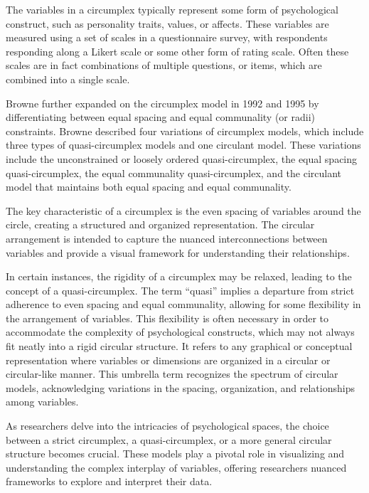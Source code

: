 \documentclass[
  authoryear,
  preprint,
  3p]{elsarticle}
\begin{document}
The variables in a circumplex typically represent some form of
psychological construct, such as personality traits, values, or affects.
These variables are measured using a set of scales in a questionnaire
survey, with respondents responding along a Likert scale or some other
form of rating scale. Often these scales are in fact combinations of
multiple questions, or items, which are combined into a single scale.

Browne further expanded on the circumplex model in 1992 and 1995 by
differentiating between equal spacing and equal communality (or radii)
constraints. Browne described four variations of circumplex models,
which include three types of quasi-circumplex models and one circulant
model. These variations include the unconstrained or loosely ordered
quasi-circumplex, the equal spacing quasi-circumplex, the equal
communality quasi-circumplex, and the circulant model that maintains
both equal spacing and equal communality.

The key characteristic of a circumplex is the even spacing of variables
around the circle, creating a structured and organized representation.
The circular arrangement is intended to capture the nuanced
interconnections between variables and provide a visual framework for
understanding their relationships.

In certain instances, the rigidity of a circumplex may be relaxed,
leading to the concept of a quasi-circumplex. The term ``quasi'' implies
a departure from strict adherence to even spacing and equal communality,
allowing for some flexibility in the arrangement of variables. This
flexibility is often necessary in order to accommodate the complexity of
psychological constructs, which may not always fit neatly into a rigid
circular structure. It refers to any graphical or conceptual
representation where variables or dimensions are organized in a circular
or circular-like manner. This umbrella term recognizes the spectrum of
circular models, acknowledging variations in the spacing, organization,
and relationships among variables.

As researchers delve into the intricacies of psychological spaces, the
choice between a strict circumplex, a quasi-circumplex, or a more
general circular structure becomes crucial. These models play a pivotal
role in visualizing and understanding the complex interplay of
variables, offering researchers nuanced frameworks to explore and
interpret their data.
\end{document}
